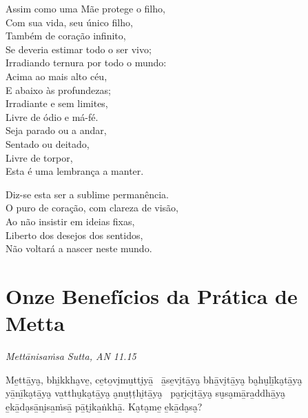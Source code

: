 Assim como uma Mãe protege o filho,\\
Com sua vida, seu único filho,\\
Também de coração infinito,\\
Se deveria estimar todo o ser vivo;\\
Irradiando ternura por todo o mundo:\\
Acima ao mais alto céu,\\
E abaixo às profundezas;\\
Irradiante e sem limites,\\
Livre de ódio e má-fé.\\
Seja parado ou a andar,\\
Sentado ou deitado,\\
Livre de torpor,\\
Esta é uma lembrança a manter.

Diz-se esta ser a sublime permanência.\\
O puro de coração, com clareza de visão,\\
Ao não insistir em ideias fixas,\\
Liberto dos desejos dos sentidos,\\
Não voltará a nascer neste mundo.

\chapter[Onze Benefícios]{Onze Benefícios da Prática de Metta}

\emph{Mettānisaṁsa Sutta, AN 11.15}


\begin{leader}
\end{leader}


Me̱ttā̱ya̮, bhi̱kkha̮ve̱, ce̱to̱vi̮mu̱tti̮yā̱ \pause\ ā̱se̱vi̮tā̱ya̮ bhā̱vi̮tā̱ya̮ ba̮hu̮lī̱ka̮tā̱ya̮ \pause\\
yā̱nī̱ka̮tā̱ya̮ va̱tthu̮ka̮tā̱ya̮ a̮nu̱ṭṭhi̮tā̱ya̮ \pause\ pa̮ri̮ci̮tā̱ya̮ su̮sa̮mā̱ra̱ddhā̱ya̮ \pause\\
e̱kā̱da̮sā̱ni̮sa̱ṁsā̱ pā̱ṭi̮ka̱ṅkhā̱. Ka̮ta̮me̱ e̱kā̱da̮sa̮?

